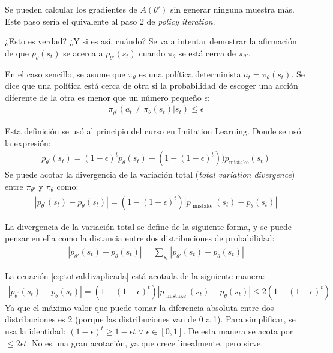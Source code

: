 Se pueden calcular los gradientes de $\bar{A}(\theta')$ sin generar ninguna muestra más. Este
paso sería el quivalente al paso 2 de \textit{policy iteration}. 

¿Esto es verdad? ¿Y si es así, cuándo? Se va a intentar demostrar la afirmación de que
$p_\theta (s_t)$ se acerca a  $p_{\theta'}(s_t)$ cuando  $\pi_\theta$ se está cerca de
$\pi_{\theta'}$. 

En el caso sencillo, se asume que $\pi_\theta$ es una política determinista
$a_t=\pi_\theta(s_t)$. Se dice que una política está cerca de otra si la probabilidad de
escoger una acción diferente de la otra es menor que un número pequeño  $\epsilon$:
 \begin{align}
\pi _ { \theta ^ { \prime } } ( a _ { t } \neq \pi _ { \theta } ( s _ { t } ) | s _ { t } ) \leq \epsilon
\end{align}

Esta definición se usó al principio del curso en Imitation Learning. Donde se usó la expresión:
\begin{align}
p _ { \theta ^ { \prime } } ( s _ { t } ) = ( 1 - \epsilon ) ^ { t } p _ { \theta } ( s _ { t } ) + ( 1 - ( 1 - \epsilon ) ^ { t } ) ) p _ { \text {mistake} } ( s _ { t } )
\end{align}
Se puede acotar la divergencia de la variación total (\textit{total variation divergence})
entre $\pi_{\theta'}$ y  $\pi_\theta$ como:
\begin{align}
    \label{eq:totvaldivaplicada}
| p _ { \theta ^ { \prime } } ( s _ { t } ) - p _ { \theta } ( s _ { t } ) | = ( 1 - ( 1 - \epsilon ) ^ { t } ) | p _ { \text { mistake } } ( s _ { t } ) - p _ { \theta } ( s _ { t } ) |
\end{align}

La divergencia de la variación total se define de la siguiente forma, y se puede pensar en ella
como la distancia entre dos distribuciones de probabilidad:
\begin{align}
    |p_{\theta'}(s_t)-p_\theta(s_t)|=\sum_{s_t}|p_{\theta'}(s_t)-p_\theta(s_t)|
\end{align}

La ecuación \ref{eq:totvaldivaplicada} está acotada de la siguiente manera:
\begin{align}
    \label{eq:totvaldivaplicada}
| p _ { \theta ^ { \prime } } ( s _ { t } ) - p _ { \theta } ( s _ { t } ) | = ( 1 - ( 1 -
\epsilon ) ^ { t } ) | p _ { \text { mistake } } ( s _ { t } ) - p _ { \theta } ( s _ { t } ) |
\leq 2 (1-(1-\epsilon)^t)
\end{align}
Ya que el máximo valor que puede tomar la diferencia absoluta entre dos distribuciones es 2
(porque las distribuciones van de 0 a 1). Para simplificar, se usa la identidad:
$(1-\epsilon)^t \geq 1 - \epsilon t \;\forall \;\epsilon \in [0,1]$. De esta manera se acota por
$\leq 2\epsilon t$. No es una gran acotación, ya que crece linealmente, pero sirve.


